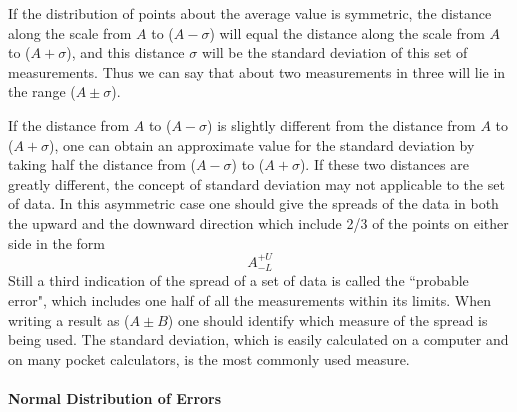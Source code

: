      If the distribution of points about the average value is
symmetric, the distance along the scale from $A$ to ($A - \sigma$) will
equal the distance along the scale from $A$ to ($A + \sigma$), and this
distance $\sigma$ will be the standard deviation of this set of
measurements.  Thus we can say that about two measurements in
three will lie in the range ($A \pm \sigma$).

     If the distance from $A$ to ($A - \sigma$) is slightly different from
the distance from $A$ to ($A + \sigma$), one can obtain an approximate value
for the standard deviation by taking half the distance from ($A - \sigma$)
to ($A + \sigma$).  If these two distances are greatly different, the
concept of standard deviation may not applicable to the set of
data.  In this asymmetric case one should give the spreads of the
data in both the upward and the downward direction which include
2/3 of the points on either side in the form
\[
A^{+U}_{-L}
\]
     Still a third indication of the spread of a set of data is
called the ``probable error", which includes one half of all the
measurements within its limits.  When writing a result as ($A \pm B$)
one should identify which measure of the spread is being used.
The standard deviation, which is easily calculated on a computer
and on many pocket calculators, is the most commonly used
measure.

\paragraph*{Normal Distribution of Errors}

